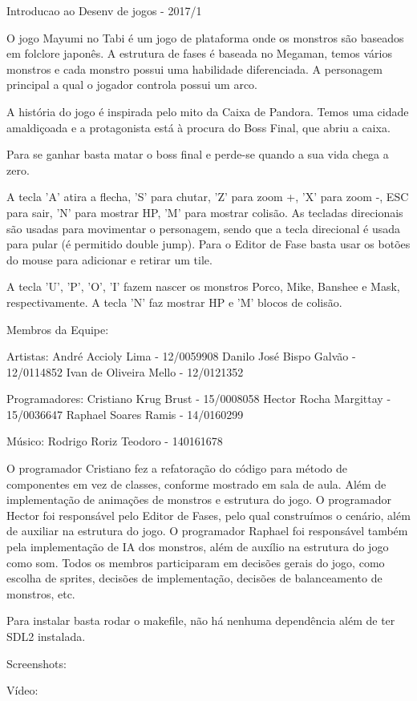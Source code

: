 Introducao ao Desenv de jogos -\/ 2017/1

O jogo Mayumi no Tabi é um jogo de plataforma onde os monstros são baseados em folclore japonês. A estrutura de fases é baseada no Megaman, temos vários monstros e cada monstro possui uma habilidade diferenciada. A personagem principal a qual o jogador controla possui um arco.

A história do jogo é inspirada pelo mito da Caixa de Pandora. Temos uma cidade amaldiçoada e a protagonista está à procura do Boss Final, que abriu a caixa.

Para se ganhar basta matar o boss final e perde-\/se quando a sua vida chega a zero.

A tecla 'A' atira a flecha, 'S' para chutar, 'Z' para zoom +, 'X' para zoom -\/, E\-S\-C para sair, 'N' para mostrar H\-P, 'M' para mostrar colisão. As tecladas direcionais são usadas para movimentar o personagem, sendo que a tecla direcional é usada para pular (é permitido double jump). Para o Editor de Fase basta usar os botões do mouse para adicionar e retirar um tile.

A tecla 'U', 'P', 'O', 'I' fazem nascer os monstros Porco, Mike, Banshee e Mask, respectivamente. A tecla 'N' faz mostrar H\-P e 'M' blocos de colisão.

Membros da Equipe\-:

Artistas\-: André Accioly Lima -\/ 12/0059908 Danilo José Bispo Galvão -\/ 12/0114852 Ivan de Oliveira Mello -\/ 12/0121352

Programadores\-: Cristiano Krug Brust -\/ 15/0008058 Hector Rocha Margittay -\/ 15/0036647 Raphael Soares Ramis -\/ 14/0160299

Músico\-: Rodrigo Roriz Teodoro -\/ 140161678

O programador Cristiano fez a refatoração do código para método de componentes em vez de classes, conforme mostrado em sala de aula. Além de implementação de animações de monstros e estrutura do jogo. O programador Hector foi responsável pelo Editor de Fases, pelo qual construímos o cenário, além de auxiliar na estrutura do jogo. O programador Raphael foi responsável também pela implementação de I\-A dos monstros, além de auxílio na estrutura do jogo como som. Todos os membros participaram em decisões gerais do jogo, como escolha de sprites, decisões de implementação, decisões de balanceamento de monstros, etc.

Para instalar basta rodar o makefile, não há nenhuma dependência além de ter S\-D\-L2 instalada.


\begin{DoxyItemize}
\item Screenshots\-:   
\item Vídeo\-: 
\end{DoxyItemize}